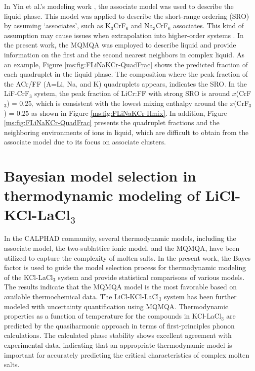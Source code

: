 In Yin et al.’s modeling work \cite{yin2018thermodynamic}, the associate model was used to describe the liquid phase. This model was applied to describe the short-range ordering (SRO) by assuming ‘associates’, such as K$_3$CrF$_6$ and Na$_3$CrF$_6$ associates. This kind of assumption may cause issues when extrapolation into higher-order systems \cite{pelton2018phase}. In the present work, the MQMQA was employed to describe liquid and provide information on the first and the second nearest neighbors in complex liquid. As an example, Figure \ref{ms:fig:FLiNaKCr-QuadFrac} shows the predicted fraction of each quadruplet in the liquid phase. The composition where the peak fraction of the ACr/FF (A=Li, Na, and K) quadruplets appears, indicates the SRO. In the LiF-CrF$_3$ system, the peak fraction of LiCr:FF with strong SRO is around $x$(CrF$_3$) = 0.25, which is consistent with the lowest mixing enthalpy around the $x$(CrF$_3$) = 0.25 as shown in Figure \ref{ms:fig:FLiNaKCr-Hmix}. In addition, Figure \ref{ms:fig:FLiNaKCr-QuadFrac} presents the quadruplet fractions and the neighboring environments of ions in liquid, which are difficult to obtain from the associate model due to its focus on associate clusters.

\section{Bayesian model selection in thermodynamic modeling of LiCl-KCl-LaCl${_3}$} \label{moltensalts:sec:LaCl3}
In the CALPHAD community, several thermodynamic models, including the associate model, the two-sublattice ionic model, and the MQMQA, have been utilized to capture the complexity of molten salts. In the present work, the Bayes factor is used to guide the model selection process for thermodynamic modeling of the KCl-LaCl$_3$ system and provide statistical comparisons of various models. The results indicate that the MQMQA model is the most favorable based on available thermochemical data. The LiCl-KCl-LaCl$_3$ system has been further modeled with uncertainty quantification using MQMQA. Thermodynamic properties as a function of temperature for the compounds in KCl-LaCl$_3$ are predicted by the quasiharmonic approach in terms of first-principles phonon calculations. The calculated phase stability shows excellent agreement with experimental data, indicating that an appropriate thermodynamic model is important for accurately predicting the critical characteristics of complex molten salts.

